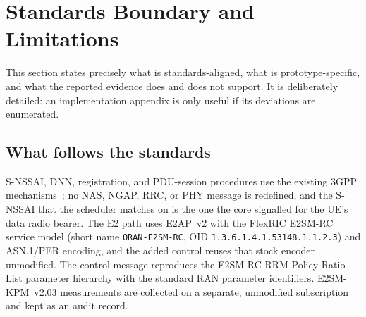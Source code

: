 \section{Standards Boundary and Limitations}
\label{sec:limitations}
This section states precisely what is standards-aligned, what is prototype-specific, and what the reported evidence does and does not support. It is deliberately detailed: an implementation appendix is only useful if its deviations are enumerated.

\subsection{What follows the standards}
S-NSSAI, DNN, registration, and PDU-session procedures use the existing 3GPP mechanisms~\cite{3gpp23501}; no NAS, NGAP, RRC, or PHY message is redefined, and the S-NSSAI that the scheduler matches on is the one the core signalled for the UE's data radio bearer. The E2 path uses E2AP~v2 with the FlexRIC E2SM-RC service model (short name \texttt{ORAN-E2SM-RC}, OID \texttt{1.3.6.1.4.1.53148.1.1.2.3}) and ASN.1/PER encoding, and the added control reuses that stock encoder unmodified. The control message reproduces the E2SM-RC RRM Policy Ratio List parameter hierarchy with the standard RAN parameter identifiers. E2SM-KPM~v2.03 measurements are collected on a separate, unmodified subscription and kept as an audit record.

